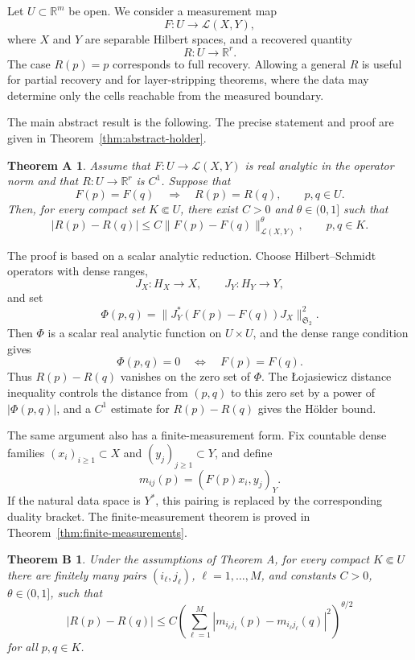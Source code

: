 \documentclass[12pt,oneside]{amsart}
\newtheorem*{theoremA}{Theorem A}
\newtheorem*{theoremB}{Theorem B}
\newcommand{\R}{\mathbb R}
\newcommand{\cL}{\mathcal L}
\newcommand{\HS}{\mathfrak S_2}
\begin{document}
Let \(U\subset\R^m\) be open.  We consider a measurement map
\[
        F:U\to \cL(X,Y),
\]
where \(X\) and \(Y\) are separable Hilbert spaces, and a recovered quantity
\[
        R:U\to\R^r .
\]
The case \(R(p)=p\) corresponds to full recovery.  Allowing a general \(R\) is
useful for partial recovery and for layer-stripping theorems, where the data may
determine only the cells reachable from the measured boundary.

The main abstract result is the following.  The precise statement and proof are
given in Theorem~\ref{thm:abstract-holder}.

\begin{theoremA}
Assume that \(F:U\to\cL(X,Y)\) is real analytic in the operator norm and that
\(R:U\to\R^r\) is \(C^1\).  Suppose that
\[
        F(p)=F(q)\quad\Longrightarrow\quad R(p)=R(q),
        \qquad p,q\in U .
\]
Then, for every compact set \(K\Subset U\), there exist \(C>0\) and
\(\theta\in(0,1]\) such that
\[
        |R(p)-R(q)|
        \le C\|F(p)-F(q)\|_{\cL(X,Y)}^\theta,
        \qquad p,q\in K .
\]
\end{theoremA}

The proof is based on a scalar analytic reduction.  Choose Hilbert--Schmidt
operators with dense ranges,
\[
        J_X:H_X\to X,\qquad J_Y:H_Y\to Y,
\]
and set
\[
        \Phi(p,q)
        =
        \|J_Y^*(F(p)-F(q))J_X\|_{\HS}^2 .
\]
Then \(\Phi\) is a scalar real analytic function on \(U\times U\), and the dense
range condition gives
\[
        \Phi(p,q)=0
        \quad\Longleftrightarrow\quad
        F(p)=F(q).
\]
Thus \(R(p)-R(q)\) vanishes on the zero set of \(\Phi\).  The \L{}ojasiewicz
distance inequality controls the distance from \((p,q)\) to this zero set by a
power of \(|\Phi(p,q)|\), and a \(C^1\) estimate for \(R(p)-R(q)\) gives the
H\"older bound.

The same argument also has a finite-measurement form.  Fix countable dense
families \((x_i)_{i\ge1}\subset X\) and \((y_j)_{j\ge1}\subset Y\), and define
\[
        m_{ij}(p)=(F(p)x_i,y_j)_Y .
\]
If the natural data space is \(Y^*\), this pairing is replaced by the
corresponding duality bracket.  The finite-measurement theorem is proved in
Theorem~\ref{thm:finite-measurements}.

\begin{theoremB}
Under the assumptions of Theorem A, for every compact \(K\Subset U\) there are
finitely many pairs \((i_\ell,j_\ell)\), \(\ell=1,\ldots,M\), and constants
\(C>0\), \(\theta\in(0,1]\), such that
\[
        |R(p)-R(q)|
        \le C
        \left(\sum_{\ell=1}^M
        |m_{i_\ell j_\ell}(p)-m_{i_\ell j_\ell}(q)|^2
        \right)^{\theta/2}
\]
for all \(p,q\in K\).
\end{theoremB}
\end{document}
